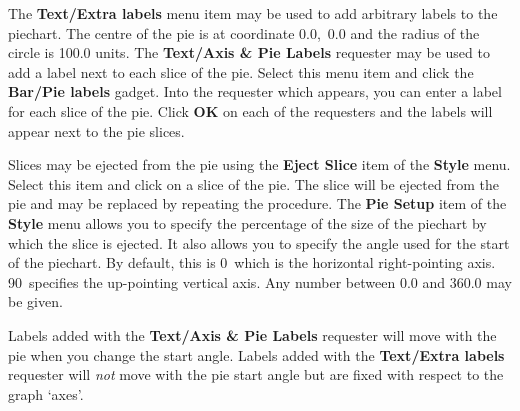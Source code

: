 The {\bf Text/Extra labels} menu item may be used to add arbitrary labels to the 
piechart. The centre of the pie is at coordinate 0.0,~0.0 and the radius of the 
circle is 100.0 units. The {\bf Text/Axis \& Pie Labels} requester may be used to 
add a label next to each slice of the pie. Select this menu item and click the {\bf 
Bar/Pie labels} gadget. Into the requester which appears, you can enter a label for 
each  slice of the pie. Click {\bf OK} on each of the requesters and the labels will 
appear next to the pie slices.

Slices may be ejected from the pie using the {\bf Eject Slice} item of the {\bf 
Style} menu. Select this item and click on a slice of the pie. The slice will be 
ejected from the pie and may be replaced by repeating the procedure. The {\bf Pie 
Setup} item of the {\bf Style} menu allows you to specify the percentage of the size 
of the piechart by which the slice is ejected. It also allows you to specify the 
angle used for the start of the piechart. By default, this is 0\degree\ which is 
the horizontal right-pointing axis. 90\degree\ specifies the up-pointing vertical 
axis. Any number between 0.0 and 360.0 may be given.

Labels added with the {\bf Text/Axis \& Pie Labels} requester will move with the pie 
when you change the start angle. Labels added with the {\bf Text/Extra labels} 
requester will {\em not\/} move with the pie start angle but are fixed with respect 
to the graph `axes'.

